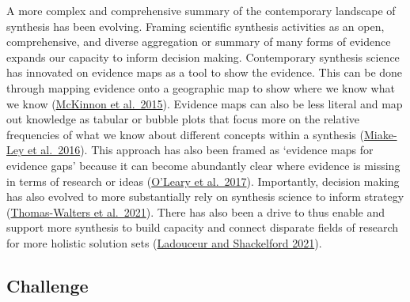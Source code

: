 \documentclass[
]{book}
\begin{document}
A more complex and comprehensive summary of the contemporary landscape of synthesis has been evolving. Framing scientific synthesis activities as an open, comprehensive, and diverse aggregation or summary of many forms of evidence expands our capacity to inform decision making. Contemporary synthesis science has innovated on evidence maps as a tool to show the evidence. This can be done through mapping evidence onto a geographic map to show where we know what we know (\href{https://www.nature.com/articles/528185a}{McKinnon et al.~2015}). Evidence maps can also be less literal and map out knowledge as tabular or bubble plots that focus more on the relative frequencies of what we know about different concepts within a synthesis (\href{https://systematicreviewsjournal.biomedcentral.com/articles/10.1186/s13643-016-0204-x}{Miake-Ley et al.~2016}). This approach has also been framed as `evidence maps for evidence gaps' because it can become abundantly clear where evidence is missing in terms of research or ideas (\href{https://environmentalevidencejournal.biomedcentral.com/articles/10.1186/s13750-017-0096-9}{O'Leary et al.~2017}). Importantly, decision making has also evolved to more substantially rely on synthesis science to inform strategy (\href{https://conbio.onlinelibrary.wiley.com/doi/full/10.1111/csp2.426}{Thomas-Walters et al.~2021}). There has also been a drive to thus enable and support more synthesis to build capacity and connect disparate fields of research for more holistic solution sets (\href{https://onlinelibrary.wiley.com/doi/full/10.1111/rec.13251}{Ladouceur and Shackelford 2021}).

\hypertarget{challenge}{%
\subsection*{Challenge}\label{challenge}}
\end{document}
